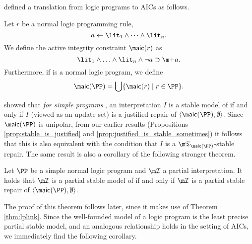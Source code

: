 





\citet{tplp/CaropreseT11} defined a translation from logic programs to AICs as follows. 
\begin{definition}
  \label{defn:aic-transf}
 Let $r$ be a normal logic programming rule, 
 \[a\leftarrow \lit_1  \land \dots \land \lit_n.\]
 We define the active integrity constraint $\aicop (r)$ as 
 \[\lit_1\wedge\ldots\wedge\lit_n\wedge\neg a \aicrule \add a.\]
 Furthermore, if \PP is a normal logic program, we define 
 \[\aicop(\PP)=\bigcup\{\aicop(r)\mid r\in \PP\}.\]
\end{definition}

\citet{tplp/CaropreseT11} showed that \emph{for simple programs \PP}, an interpretation $I$ is a stable model of \PP if and only if $I$ (viewed as an update set) is a justified repair of $\langle\aicop(\PP),\emptyset\rangle$. Since $\aicop(\PP)$ is unipolar, from our earlier results (Propositions \ref{prop:stable_is_justified} and \ref{prop:justified_is_stable_sometimes}) it follows that this is also equivalent with the condition that $I$ is a $\threeap_{\aicop(\PP)}$-stable repair. 
The same result is also a corollary of the following stronger theorem. 
\begin{theorem}\label{thm:partialstable-LP}
 Let $\PP$ be a simple normal logic program and $\pstruct$ a partial interpretation. It holds that $\pstruct$ is a partial stable model of \PP if and only if $\pstruct$ is a partial stable repair of $\langle \aicop(\PP),\emptyset\rangle$. 
\end{theorem}
The proof of this theorem follows later, since it makes use of Theorem \ref{thm:lplink}. 
Since the well-founded model of a logic program is the least precise partial stable model, and an analogous relationship holds in the setting of AICs, we immediately find the following corollary. 

